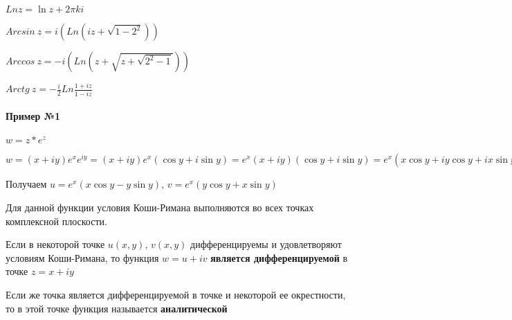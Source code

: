 \documentclass{article}
\begin{document}
$Ln z = \ln z + 2 \pi k i$

\hfill

$Arcsin \ z = i (Ln (i z + \sqrt{1 - 2^2}))$

$Arccos \ z = - i (Ln (z + \sqrt{z + \sqrt{2^2 - 1}}))$

$Arctg \ z = - \frac{i}{2} Ln \frac{1 + i z}{1 - iz}$

\paragraph{Пример №1}

$w = z * e^{z}$

$w  = (x + i y) e^{x} e^{i y} = (x + i y) e^{x} (\cos y + i \sin y) = e^{x} (x + i y)(\cos y + i \sin y) = e^{x} (x \cos y + i y \cos y + i x \sin y + i^{2} y \sin y) = e^{x} (x \cos y - y \sin y) + i e^{x} (y \cos y + x \sin y)$

Получаем $u = e^{x} (x \cos y - y \sin y)$, $v = e^{x} (y \cos y + x \sin y)$

\hfill

\begin{multienumerate}
\end{multienumerate}

Для данной функции условия Коши-Римана выполняются во всех точках комплексной плоскости.

\hfill

Если в некоторой точке $u (x, y)$, $v (x, y)$ дифференцируемы и удовлетворяют условиям Коши-Римана, то функция $w = u + i v$ \textbf{является дифференцируемой} в точке $z = x + i y$

Если же точка является дифференцируемой в точке и некоторой ее окрестности, то в этой точке функция называется \textbf{аналитической}
\end{document}
